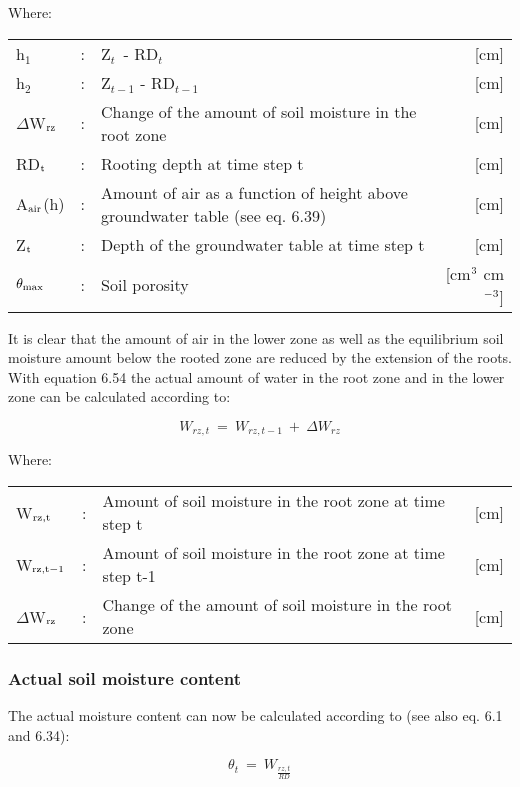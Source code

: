 Where:\\[5pt]
\begin{tabularx}{\textwidth}{llXr}
h$_{1}$ &:& Z$_{t~}$ - RD$_{t~}$ & [cm]\\
h$_{2}$ &:& Z$_{t-1}$ - RD$_{t-1}$ & [cm]\\
$\Delta$W$_{{\rm rz}}$ &:& Change of the amount of soil moisture in the root zone  & [cm]\\
RD$_{{\rm t}}$ &:& Rooting depth at time step t  & [cm]\\
A$_{{\rm air}}$(h) &:& Amount of air as a function of height above groundwater 
   table  (see eq. 6.39) & [cm]\\
Z$_{{\rm t}}$ &:& Depth of the groundwater table at time step t  & [cm]\\
$\theta_{{\rm max}}$ &:& Soil porosity  & [cm$^{{\rm 3}}$ cm$^{{\rm -3}}$]\\
\end{tabularx}

It is clear that the amount of air in the lower zone as well as the equilibrium soil moisture
amount below the rooted zone are reduced by the extension of the roots. With equation
6.54 the actual amount of water in the root zone and in the lower zone can be calculated
according to:

\begin{equation}
W_{rz,t} ~=~ W_{rz, t-1} ~+~ \Delta W_{rz} 
\end{equation}

Where:\\[5pt]
\begin{tabularx}{\textwidth}{llXr}
W$_{{\rm rz,t}}$ &:& Amount of soil moisture in the root zone at time step t  & [cm]\\
W$_{{\rm rz,t-1}}$ &:& Amount of soil moisture in the root zone at time step t-1  & [cm]\\
$\Delta$W$_{{\rm rz}}$ &:& Change of the amount of soil moisture in the root zone  & [cm]\\
\end{tabularx}

\subsubsection{Actual soil moisture content}
The actual moisture content can now be calculated according to (see also eq. 6.1 and 6.34):

\begin{equation}
\theta_{t} ~=~ W _{\frac{rz, t}{RD}} 
\end{equation}

